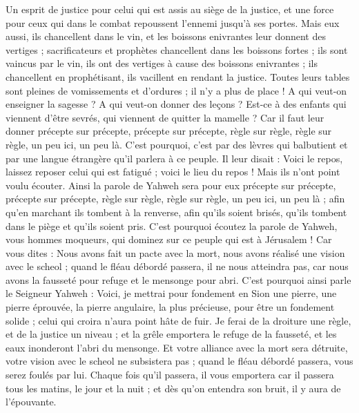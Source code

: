 \begin{multicols}{2}
Un esprit de justice pour celui qui est assis au siège de la justice, et une force pour ceux qui dans le combat repoussent l'ennemi jusqu'à ses portes.
Mais eux aussi, ils chancellent dans le vin, et les boissons enivrantes leur donnent des vertiges ; sacrificateurs et prophètes chancellent dans les boissons fortes ; ils sont vaincus par le vin, ils ont des vertiges à cause des boissons enivrantes ; ils chancellent en prophétisant, ils vacillent en rendant la justice.
Toutes leurs tables sont pleines de vomissements et d'ordures ; il n'y a plus de place !
A qui veut-on enseigner la sagesse ? A qui veut-on donner des leçons ? Est-ce à des enfants qui viennent d'être sevrés, qui viennent de quitter la mamelle ?
Car il faut leur donner précepte sur précepte, précepte sur précepte, règle sur règle, règle sur règle, un peu ici, un peu là.
C'est pourquoi, c'est par des lèvres qui balbutient et par une langue étrangère qu'il parlera à ce peuple.
Il leur disait : Voici le repos, laissez reposer celui qui est fatigué ; voici le lieu du repos ! Mais ils n'ont point voulu écouter.
Ainsi la parole de Yahweh sera pour eux précepte sur précepte, précepte sur précepte, règle sur règle, règle sur règle, un peu ici, un peu là ; afin qu'en marchant ils tombent à la renverse, afin qu'ils soient brisés, qu'ils tombent dans le piège et qu'ils soient pris.
C'est pourquoi écoutez la parole de Yahweh, vous hommes moqueurs, qui dominez sur ce peuple qui est à Jérusalem !
Car vous dites : Nous avons fait un pacte avec la mort, nous avons réalisé une vision avec le scheol ; quand le fléau débordé passera, il ne nous atteindra pas, car nous avons la fausseté pour refuge et le mensonge pour abri.
C'est pourquoi ainsi parle le Seigneur Yahweh : Voici, je mettrai pour fondement en Sion une pierre, une pierre éprouvée, la pierre angulaire, la plus précieuse, pour être un fondement solide ; celui qui croira n'aura point hâte de fuir.
Je ferai de la droiture une règle, et de la justice un niveau ; et la grêle emportera le refuge de la fausseté, et les eaux inonderont l'abri du mensonge.
Et votre alliance avec la mort sera détruite, votre vision avec le scheol ne subsistera pas ; quand le fléau débordé passera, vous serez foulés par lui.
Chaque fois qu'il passera, il vous emportera car il passera tous les matins, le jour et la nuit ; et dès qu'on entendra son bruit, il y aura de l'épouvante.

\end{multicols}
